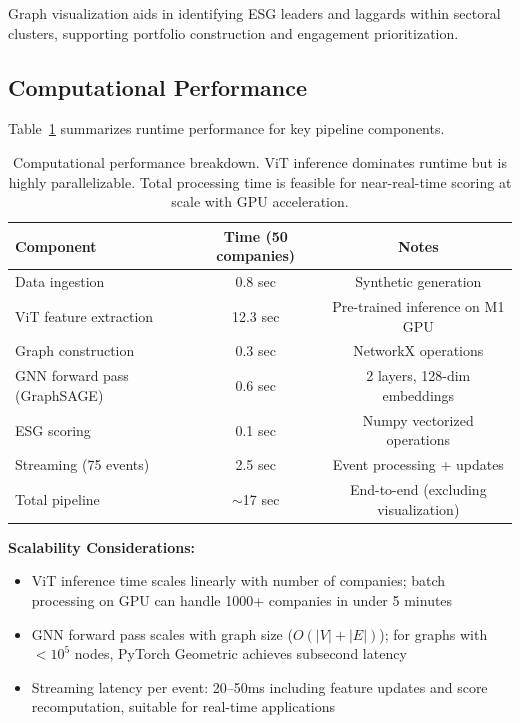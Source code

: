 Graph visualization aids in identifying ESG leaders and laggards within sectoral clusters, supporting portfolio construction and engagement prioritization.

\subsection{Computational Performance}

Table~\ref{tab:performance} summarizes runtime performance for key pipeline components.

\begin{table}[h!]
\centering
 \begin{tabular}{l c c}
 \hline
 \textbf{Component} & \textbf{Time (50 companies)} & \textbf{Notes} \\ [0.5ex]
 \hline
 Data ingestion & 0.8 sec & Synthetic generation \\
 ViT feature extraction & 12.3 sec & Pre-trained inference on M1 GPU \\
 Graph construction & 0.3 sec & NetworkX operations \\
 GNN forward pass (GraphSAGE) & 0.6 sec & 2 layers, 128-dim embeddings \\
 ESG scoring & 0.1 sec & Numpy vectorized operations \\
 Streaming (75 events) & 2.5 sec & Event processing + updates \\
 Total pipeline & $\sim$17 sec & End-to-end (excluding visualization) \\ [0.5ex]
 \hline
 \end{tabular}
 \caption{\label{tab:performance}Computational performance breakdown. ViT inference dominates runtime but is highly parallelizable. Total processing time is feasible for near-real-time scoring at scale with GPU acceleration.}
\end{table}

\textbf{Scalability Considerations:}
\begin{itemize}
\item ViT inference time scales linearly with number of companies; batch processing on GPU can handle 1000+ companies in under 5 minutes
\item GNN forward pass scales with graph size ($O(|V| + |E|)$); for graphs with $<10^5$ nodes, PyTorch Geometric achieves subsecond latency
\item Streaming latency per event: 20–50ms including feature updates and score recomputation, suitable for real-time applications
\end{itemize}

